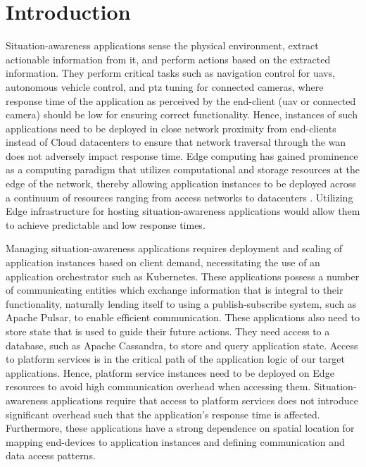 \chapter{Introduction}
\label{sec:intro}

Situation-awareness applications sense the physical environment, extract actionable information from it, and perform actions based on the extracted information. They perform critical tasks such as navigation control for \glspl{uav}, autonomous vehicle control, and \gls{ptz} tuning for connected cameras, where response time of the application as perceived by the end-client (\gls{uav} or connected camera) should be low for ensuring correct functionality.  Hence, instances of such applications need to be deployed in close network proximity from end-clients instead of Cloud datacenters to ensure that network traversal through the \gls{wan} does not adversely impact response time. Edge computing has gained prominence as a computing paradigm that utilizes computational and storage resources at the edge of the network, thereby allowing application instances to be deployed across a continuum of resources ranging from access networks to datacenters \cite{ramachandran2021case}. Utilizing Edge infrastructure for hosting situation-awareness applications would allow them to achieve predictable and low response times.
\par Managing situation-awareness applications requires deployment and scaling of application instances based on client demand, necessitating the use of an application orchestrator such as Kubernetes. These applications possess a number of communicating entities which exchange information that is integral to their functionality, naturally lending itself to using a publish-subscribe system, such as Apache Pulsar, to enable efficient communication. These applications also need to store state that is used to guide their future actions. They need access to a database, such as Apache Cassandra, to store and query application state. Access to platform services is in the critical path of the application logic of our target applications. Hence, platform service instances need to be deployed on Edge resources to avoid high communication overhead when accessing them. Situation-awareness applications require that access to platform services does not introduce significant overhead such that the application's response time is affected. Furthermore, these applications have a strong dependence on spatial location for mapping end-devices to application instances and defining communication and data access patterns.

